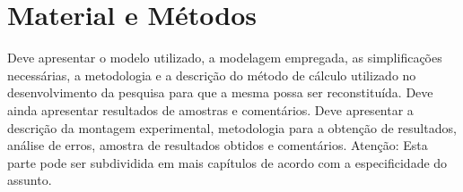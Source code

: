 
\chapter{Material e Métodos}\label{cap:materialemetodos}

Deve apresentar o modelo utilizado, a modelagem empregada, as simplificações necessárias, a metodologia e a descrição do método de cálculo utilizado no desenvolvimento da pesquisa para que a mesma possa ser reconstituída. Deve ainda apresentar resultados de amostras e comentários. Deve apresentar a descrição da montagem experimental, metodologia para a obtenção de resultados, análise de erros, amostra de resultados obtidos e comentários. Atenção: Esta parte pode ser subdividida em mais capítulos de acordo com a especificidade do assunto.
